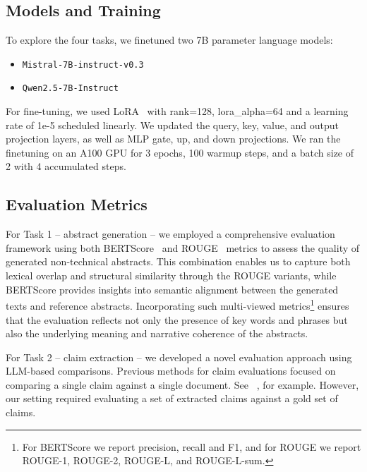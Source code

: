 \documentclass[11pt]{article}
\begin{document}
\subsection{Models and Training}

To explore the four tasks, we finetuned two 7B parameter language models:
\begin{itemize}[noitemsep,topsep=0pt]
\item \texttt{Mistral-7B-instruct-v0.3}~\cite{jiang2023mistral7b}
\item \texttt{Qwen2.5-7B-Instruct}~\cite{qwen2}
\end{itemize}

For fine-tuning, we used LoRA~\cite{hu2021lora} with rank=128, lora\_alpha=64 and a learning rate of 1e-5 scheduled linearly. We updated the query, key, value, and output projection layers, as well as MLP gate, up, and down projections. We ran the finetuning on an A100 GPU for 3 epochs, 100 warmup steps, and a batch size of 2 with 4 accumulated steps. 

\subsection{Evaluation Metrics}

For Task 1 -- abstract generation -- we employed a comprehensive evaluation framework using both BERTScore~\cite{zhang2020bertscore} and ROUGE~\cite{lin-2004-rouge} metrics to assess the quality of generated non-technical abstracts. This combination enables us to capture both lexical overlap and structural similarity through the ROUGE variants, while BERTScore provides insights into semantic alignment between the generated texts and reference abstracts. Incorporating such multi-viewed metrics\footnote{For BERTScore we report precision, recall and F1, and for ROUGE we report ROUGE-1, ROUGE-2, ROUGE-L, and ROUGE-L-sum.} ensures that the evaluation reflects not only the presence of key words and phrases but also the underlying meaning and narrative coherence of the abstracts.

For Task 2 -- claim extraction -- we developed a novel evaluation approach using LLM-based comparisons. Previous methods for claim evaluations focused on comparing a single claim against a single document. See ~\citet{tang-etal-2024-minicheck}, for example. However, our setting required evaluating a set of extracted claims against a gold set of claims.
\end{document}
